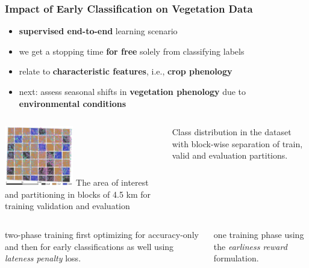 \documentclass[%
  aspectratio=169,
  9pt,
  USenglish,
  titlegraphic, %
  progressbar,
]{beamer}
\begin{document}
\begin{frame}
\frametitle{Impact of Early Classification on Vegetation Data}

\Large

\begin{itemize}[itemsep=1em]
\item<1-> \textbf{supervised end-to-end} learning scenario
\item<2-> we get a stopping time \textbf{for free} solely from classifying labels
\item<3-> relate to \textbf{characteristic features}, i.e., \textbf{crop phenology}
\item<4-> next: assess seasonal shifts in \textbf{vegetation phenology} due to \textbf{environmental conditions}
\end{itemize}

\end{frame}

\begin{frame}
	
	\begin{columns}
			\centering\includegraphics[width=3cm]{images/holl.pdf}
			The area of interest and partitioning in blocks of 4.5 km for training validation and evaluation
			
			
			{Class distribution in the dataset with block-wise separation of train, valid and evaluation partitions.}
	
\end{columns}
\end{frame}

\begin{frame}
	
	
	


	\begin{columns}
\figtwophasecrossentropy
{two-phase training first optimizing for accuracy-only and then for early classifications as well using \emph{lateness penalty} loss.}

\figearlyreward
{one training phase using the \emph{earliness reward} formulation.}
\end{columns}
	
	
\end{frame}
\end{document}
